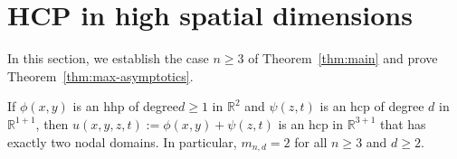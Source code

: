 \documentclass[10pt]{amsart}
\theoremstyle{definition}\newtheorem{defi}[theo]{Definition}\newtheorem{rema}[theo]{Remark}\newtheorem{exam}[theo]{Example}\newtheorem{exem}[theo]{Example}\newtheorem{nota}[theo]{Notation}
\newcommand{\R}{\mathbb{R}}
\begin{document}
\section{HCP in high spatial dimensions}\label{sec:high_dim}

In this section, we establish the case $n\geq 3$ of Theorem~\ref{thm:main} and prove Theorem~\ref{thm:max-asymptotics}.

\begin{prop} \label{prop:high_dim}
If $\phi(x,y)$ is an hhp of degree\linebreak $d\geq 1$ in $\R^{2}$ and $\psi(z,t)$ is an hcp of degree $d$ in $\R^{1+1}$, then $u(x,y,z,t):=\phi(x,y)+\psi(z,t)$ is an hcp in $\R^{3+1}$ that has exactly two nodal domains. In particular, $m_{n,d}=2$ for all $n\geq 3$ and $d\geq 2$.
\end{prop}
\end{document}
